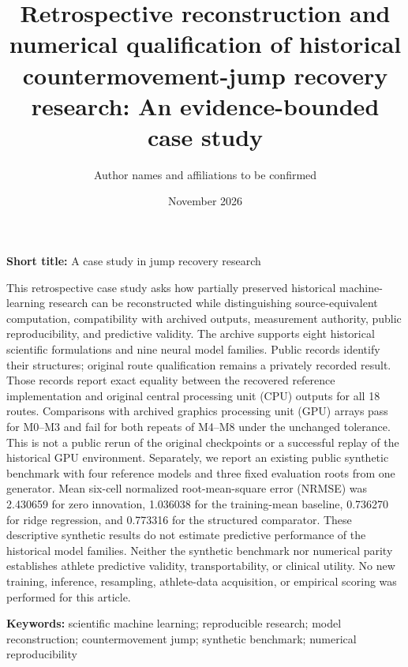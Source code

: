 \documentclass[12pt,a4paper]{article}
\renewenvironment{abstract}{\noindent{\sffamily\bfseries\footnotesize\color{cobalt}ABSTRACT}\par\vspace{2pt}\small\noindent\ignorespaces}{\par}
\begin{document}
\ifdefined\ReviewEdition
  \doublespacing
  \modulolinenumbers[1]
  \linenumbers
\else
\fi

\ifdefined\ReviewEdition
\title{Retrospective reconstruction and numerical qualification of historical countermovement-jump recovery research: An evidence-bounded case study}
\author{Author names and affiliations to be confirmed}
\date{November 2026}
\maketitle
\noindent\textbf{Short title:} A case study in jump recovery research
\else
\newsavebox{\abstractbox}
\begin{lrbox}{\abstractbox}\begin{minipage}[t]{0.485\textwidth}
\fi
\begin{abstract}
This retrospective case study asks how partially preserved historical machine-learning research can be reconstructed while distinguishing source-equivalent computation, compatibility with archived outputs, measurement authority, public reproducibility, and predictive validity. The archive supports eight historical scientific formulations and nine neural model families. Public records identify their structures; original route qualification remains a privately recorded result. Those records report exact equality between the recovered reference implementation and original central processing unit (CPU) outputs for all 18 routes. Comparisons with archived graphics processing unit (GPU) arrays pass for M0--M3 and fail for both repeats of M4--M8 under the unchanged tolerance. This is not a public rerun of the original checkpoints or a successful replay of the historical GPU environment. Separately, we report an existing public synthetic benchmark with four reference models and three fixed evaluation roots from one generator. Mean six-cell normalized root-mean-square error (NRMSE) was 2.430659 for zero innovation, 1.036038 for the training-mean baseline, 0.736270 for ridge regression, and 0.773316 for the structured comparator. These descriptive synthetic results do not estimate predictive performance of the historical model families. Neither the synthetic benchmark nor numerical parity establishes athlete predictive validity, transportability, or clinical utility. No new training, inference, resampling, athlete-data acquisition, or empirical scoring was performed for this article.
\end{abstract}
\ifdefined\ReviewEdition
\noindent\textbf{Keywords:} scientific machine learning; reproducible research; model reconstruction; countermovement jump; synthetic benchmark; numerical reproducibility
\else
\end{minipage}\end{lrbox}
\end{document}
